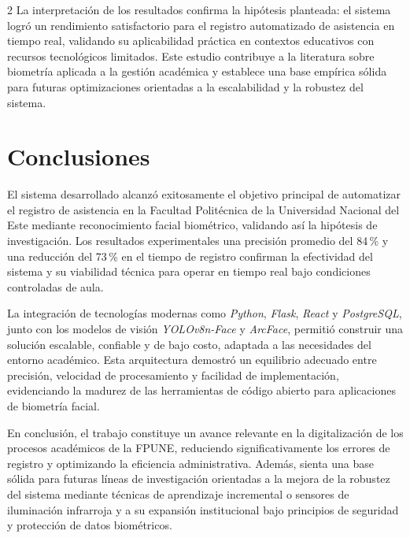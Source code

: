 \documentclass[10pt,a4paper]{article}
\begin{document}
\begin{multicols}{2}
La interpretación de los resultados confirma la hipótesis planteada: el sistema logró un rendimiento satisfactorio para el registro automatizado de asistencia en tiempo real, validando su aplicabilidad práctica en contextos educativos con recursos tecnológicos limitados. Este estudio contribuye a la literatura sobre biometría aplicada a la gestión académica y establece una base empírica sólida para futuras optimizaciones orientadas a la escalabilidad y la robustez del sistema.


\section{Conclusiones}

El sistema desarrollado alcanzó exitosamente el objetivo principal de automatizar el registro de asistencia en la Facultad Politécnica de la Universidad Nacional del Este mediante reconocimiento facial biométrico, validando así la hipótesis de investigación. Los resultados experimentales una precisión promedio del 84\,\% y una reducción del 73\,\% en el tiempo de registro confirman la efectividad del sistema y su viabilidad técnica para operar en tiempo real bajo condiciones controladas de aula.

La integración de tecnologías modernas como \textit{Python}, \textit{Flask}, \textit{React} y \textit{PostgreSQL}, junto con los modelos de visión \textit{YOLOv8n-Face} y \textit{ArcFace}, permitió construir una solución escalable, confiable y de bajo costo, adaptada a las necesidades del entorno académico. Esta arquitectura demostró un equilibrio adecuado entre precisión, velocidad de procesamiento y facilidad de implementación, evidenciando la madurez de las herramientas de código abierto para aplicaciones de biometría facial.

En conclusión, el trabajo constituye un avance relevante en la digitalización de los procesos académicos de la FPUNE, reduciendo significativamente los errores de registro y optimizando la eficiencia administrativa. Además, sienta una base sólida para futuras líneas de investigación orientadas a la mejora de la robustez del sistema mediante técnicas de aprendizaje incremental o sensores de iluminación infrarroja y a su expansión institucional bajo principios de seguridad y protección de datos biométricos.




\end{multicols}
\end{document}
